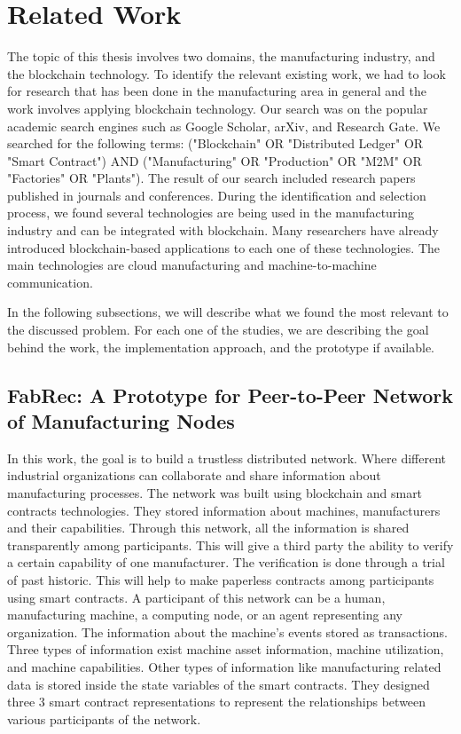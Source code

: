 \documentclass[runningheads]{llncs}
\begin{document}
\section{Related Work}
The topic of this thesis involves two domains, the manufacturing industry, and the blockchain technology. To identify the relevant existing work, we had to look for research that has been done in the manufacturing area in general and the work involves applying blockchain technology. Our search was on the popular academic search engines such as Google Scholar, arXiv, and Research Gate. We searched for the following terms: ("Blockchain" OR "Distributed Ledger" OR "Smart Contract") AND ("Manufacturing" OR "Production" OR "M2M" OR "Factories" OR "Plants").  The result of our search included research papers published in journals and conferences. During the identification and selection process, we found several technologies are being used in the manufacturing industry and can be integrated with blockchain. Many researchers have already introduced blockchain-based applications to each one of these technologies. The main technologies are cloud manufacturing and machine-to-machine communication.  
\bigbreak

\noindent
In the following subsections, we will describe what we found the most relevant to the discussed problem. For each one of the studies, we are describing the goal behind the work, the implementation approach, and the prototype if available. 

\subsection{FabRec: A Prototype for Peer-to-Peer Network of Manufacturing Nodes \cite{Angrish2018a}}

In this work, the goal is to build a trustless distributed network. Where different industrial organizations can collaborate and share information about manufacturing processes. The network was built using blockchain and smart contracts technologies. They stored information about machines, manufacturers and their capabilities. Through this network, all the information is shared transparently among participants. This will give a third party the ability to verify a certain capability of one manufacturer. The verification is done through a trial of past historic. This will help to make paperless contracts among participants using smart contracts. A participant of this network can be a human, manufacturing machine, a computing node, or an agent representing any organization. The information about the machine's events stored as transactions. Three types of information exist machine asset information, machine utilization, and machine capabilities. Other types of information like manufacturing related data is stored inside the state variables of the smart contracts.  They designed three 3 smart contract representations to represent the relationships between various participants of the network.
\bigbreak
\end{document}
